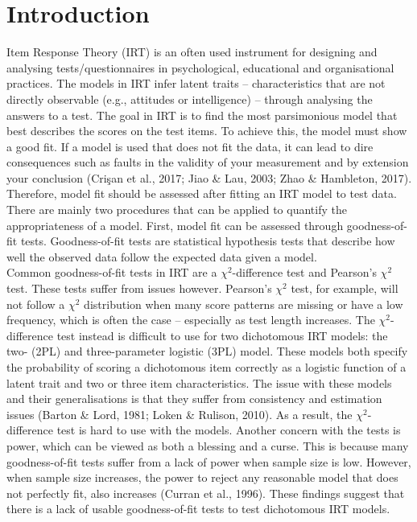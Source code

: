 \documentclass[Royal,sageapa,times,doublespace]{sagej}
\begin{document}
\maketitle

\section{Introduction}
Item Response Theory (IRT) is an often used instrument for designing and analysing tests/questionnaires in psychological, educational and organisational practices. The models in IRT infer latent traits -- characteristics that are not directly observable (e.g., attitudes or intelligence) -- through analysing the answers to a test. The goal in IRT is to find the most parsimonious model that best describes the scores on the test items. To achieve this, the model must show a good fit. If a model is used that does not fit the data, it can lead to dire consequences such as faults in the validity of your measurement and by extension your conclusion (Cri\c{s}an et al., 2017; Jiao \& Lau, 2003; Zhao \& Hambleton, 2017). Therefore, model fit should be assessed after fitting an IRT model to test data. \\
\indent There are mainly two procedures that can be applied to quantify the appropriateness of a model. First, model fit can be assessed through goodness-of-fit tests. Goodness-of-fit tests are statistical hypothesis tests that describe how well the observed data follow the expected data given a model. \\
\indent Common goodness-of-fit tests in IRT are a $\chi^2$-difference test and Pearson's $\chi^2$ test. These tests suffer from issues however. Pearson's $\chi^2$ test, for example, will not follow a $\chi^2$ distribution when many score patterns are missing or have a low frequency, which is often the case -- especially as test length increases. The $\chi^2$-difference test instead is difficult to use for two dichotomous IRT models: the two- (2PL) and three-parameter logistic (3PL) model. These models both specify the probability of scoring a dichotomous item correctly as a logistic function of a latent trait and two or three item characteristics. The issue with these models and their generalisations is that they suffer from consistency and estimation issues (Barton \& Lord, 1981; Loken \& Rulison, 2010). As a result, the $\chi^2$-difference test is hard to use with the models. Another concern with the tests is power, which can be viewed as both a blessing and a curse. This is because many goodness-of-fit tests suffer from a lack of power when sample size is low. However, when sample size increases, the power to reject any reasonable model that does not perfectly fit, also increases (Curran et al., 1996). These findings suggest that there is a lack of usable goodness-of-fit tests to test dichotomous IRT models. \\
\end{document}
